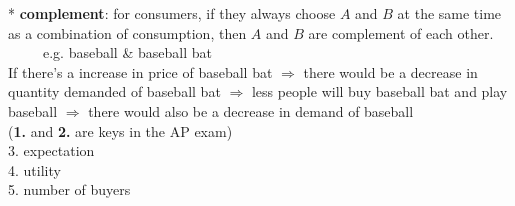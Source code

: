 \documentclass[UTF8]{article}
\begin{document}
* \textbf{complement}: for consumers, if they always choose $A$ and $B$ at the same time as a combination of consumption, then $A$ and $B$ are complement of each other. \ \ \ \ \ e.g. baseball \& baseball bat\\
If there's a increase in price of baseball bat $\Longrightarrow$ there would be a decrease in quantity demanded of baseball bat $\Longrightarrow$ less people will buy baseball bat and play baseball $\Longrightarrow$ there would also be a decrease in demand of baseball\\

\noindent
(\textbf{1.} and \textbf{2.} are keys in the AP exam)\\
3. expectation\\
4. utility\\
5. number of buyers\\

\newpage
\end{document}
